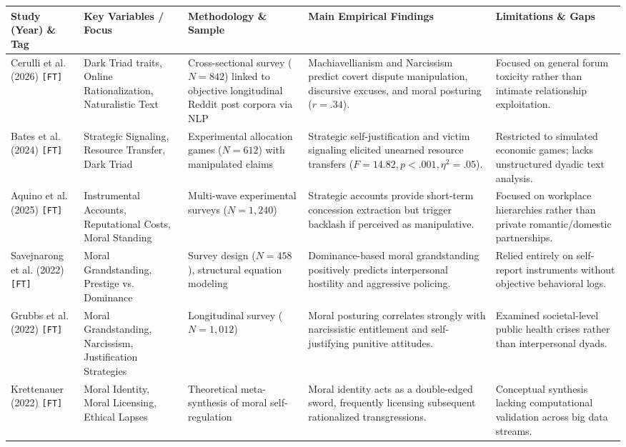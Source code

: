 \begin{table}[htbp]
\centering
\tiny
\begin{tabularx}{\textwidth}{p{2.8cm}p{2.6cm}p{3.2cm}p{4.2cm}p{2.8cm}}
\toprule
\textbf{Study (Year) \& Tag} & \textbf{Key Variables / Focus} & \textbf{Methodology \& Sample} & \textbf{Main Empirical Findings} & \textbf{Limitations \& Gaps} \\
\midrule
Cerulli et al. (2026) \citep{cerulli2026dark} \texttt{[FT]} & Dark Triad traits, Online Rationalization, Naturalistic Text & Cross-sectional survey ($N=842$) linked to objective longitudinal Reddit post corpora via NLP & Machiavellianism and Narcissism predict covert dispute manipulation, discursive excuses, and moral posturing ($r=.34$). & Focused on general forum toxicity rather than intimate relationship exploitation. \\
\addlinespace
Bates et al. (2024) \citep{bates2024virtuous} \texttt{[FT]} & Strategic Signaling, Resource Transfer, Dark Triad & Experimental allocation games ($N=612$) with manipulated claims & Strategic self-justification and victim signaling elicited unearned resource transfers ($F=14.82, p<.001, \eta^2=.05$). & Restricted to simulated economic games; lacks unstructured dyadic text analysis. \\
\addlinespace
Aquino et al. (2025) \citep{aquino2025reputational} \texttt{[FT]} & Instrumental Accounts, Reputational Costs, Moral Standing & Multi-wave experimental surveys ($N=1,240$) & Strategic accounts provide short-term concession extraction but trigger backlash if perceived as manipulative. & Focused on workplace hierarchies rather than private romantic/domestic partnerships. \\
\addlinespace
Savejnarong et al. (2022) \citep{savejnarong2022interpersonal} \texttt{[FT]} & Moral Grandstanding, Prestige vs. Dominance & Survey design ($N=458$), structural equation modeling & Dominance-based moral grandstanding positively predicts interpersonal hostility and aggressive policing. & Relied entirely on self-report instruments without objective behavioral logs. \\
\addlinespace
Grubbs et al. (2022) \citep{grubbs2022moral} \texttt{[FT]} & Moral Grandstanding, Narcissism, Justification Strategies & Longitudinal survey ($N=1,012$) & Moral posturing correlates strongly with narcissistic entitlement and self-justifying punitive attitudes. & Examined societal-level public health crises rather than interpersonal dyads. \\
\addlinespace
Krettenauer (2022) \citep{krettenauer2022when} \texttt{[FT]} & Moral Identity, Moral Licensing, Ethical Lapses & Theoretical meta-synthesis of moral self-regulation & Moral identity acts as a double-edged sword, frequently licensing subsequent rationalized transgressions. & Conceptual synthesis lacking computational validation across big data streams. \\

\end{tabularx}
\end{table}
